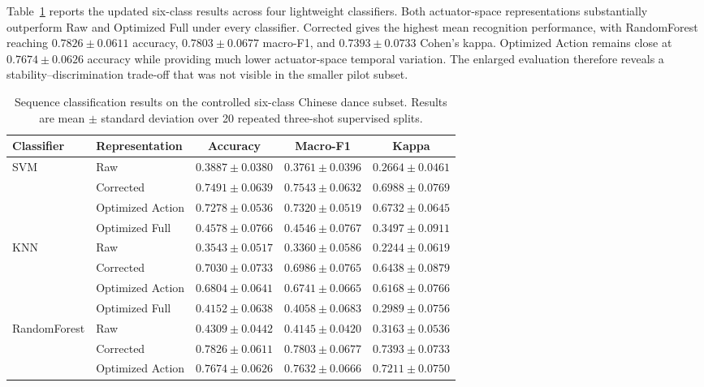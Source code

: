 \documentclass[11pt]{article}
\begin{document}
Table~\ref{tab:main_classifiers} reports the updated six-class results across four lightweight classifiers. Both actuator-space representations substantially outperform Raw and Optimized Full under every classifier. Corrected gives the highest mean recognition performance, with RandomForest reaching $0.7826 \pm 0.0611$ accuracy, $0.7803 \pm 0.0677$ macro-F1, and $0.7393 \pm 0.0733$ Cohen's kappa. Optimized Action remains close at $0.7674 \pm 0.0626$ accuracy while providing much lower actuator-space temporal variation. The enlarged evaluation therefore reveals a stability--discrimination trade-off that was not visible in the smaller pilot subset.

\begin{table}[!t]
\centering
\caption{Sequence classification results on the controlled six-class Chinese dance subset. Results are mean $\pm$ standard deviation over 20 repeated three-shot supervised splits.}
\label{tab:main_classifiers}
\scriptsize
\begin{tabular}{@{}llccc@{}}
\toprule
Classifier & Representation & Accuracy & Macro-F1 & Kappa \\
\midrule
\multirow{4}{*}{SVM}
& Raw & $0.3887 \pm 0.0380$ & $0.3761 \pm 0.0396$ & $0.2664 \pm 0.0461$ \\
& Corrected & $\mathbf{0.7491 \pm 0.0639}$ & $\mathbf{0.7543 \pm 0.0632}$ & $\mathbf{0.6988 \pm 0.0769}$ \\
& Optimized Action & $0.7278 \pm 0.0536$ & $0.7320 \pm 0.0519$ & $0.6732 \pm 0.0645$ \\
& Optimized Full & $0.4578 \pm 0.0766$ & $0.4546 \pm 0.0767$ & $0.3497 \pm 0.0911$ \\
\midrule
\multirow{4}{*}{KNN}
& Raw & $0.3543 \pm 0.0517$ & $0.3360 \pm 0.0586$ & $0.2244 \pm 0.0619$ \\
& Corrected & $\mathbf{0.7030 \pm 0.0733}$ & $\mathbf{0.6986 \pm 0.0765}$ & $\mathbf{0.6438 \pm 0.0879}$ \\
& Optimized Action & $0.6804 \pm 0.0641$ & $0.6741 \pm 0.0665$ & $0.6168 \pm 0.0766$ \\
& Optimized Full & $0.4152 \pm 0.0638$ & $0.4058 \pm 0.0683$ & $0.2989 \pm 0.0756$ \\
\midrule
\multirow{4}{*}{RandomForest}
& Raw & $0.4309 \pm 0.0442$ & $0.4145 \pm 0.0420$ & $0.3163 \pm 0.0536$ \\
& Corrected & $\mathbf{0.7826 \pm 0.0611}$ & $\mathbf{0.7803 \pm 0.0677}$ & $\mathbf{0.7393 \pm 0.0733}$ \\
& Optimized Action & $0.7674 \pm 0.0626$ & $0.7632 \pm 0.0666$ & $0.7211 \pm 0.0750$ \\

\end{tabular}
\end{table}
\end{document}
